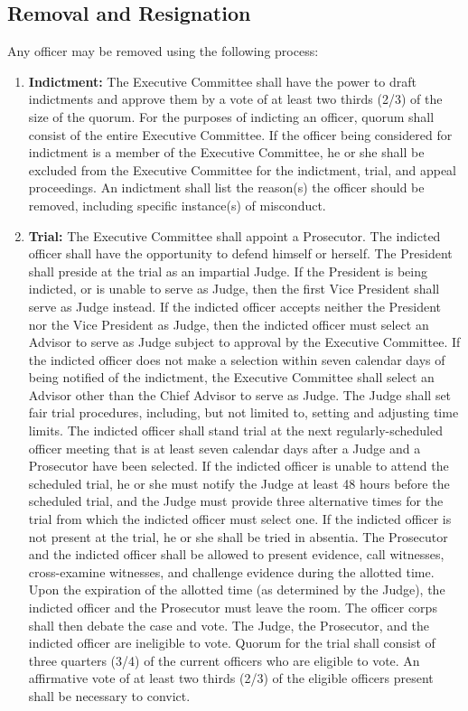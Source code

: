 \documentclass{article}
\begin{document}
	\subsection{Removal and Resignation}
	Any officer may be removed using the following process:
	\begin{enumerate}[\indent (a)]
		\item \textbf{Indictment:} The Executive Committee shall have the power to draft indictments and approve them by a vote of at least two thirds (2/3) of the size of the quorum. For the purposes of indicting an officer, quorum shall consist of the entire Executive Committee. If the officer being considered for indictment is a member of the Executive Committee, he or she shall be excluded from the Executive Committee for the indictment, trial, and appeal proceedings. An indictment shall list the reason(s) the officer should be removed, including specific instance(s) of misconduct.
		\item \textbf{Trial:} The Executive Committee shall appoint a Prosecutor. The indicted officer shall have the opportunity to defend himself or herself. The President shall preside at the trial as an impartial Judge. If the President is being indicted, or is unable to serve as Judge, then the first Vice President shall serve as Judge instead. If the indicted officer accepts neither the President nor the Vice President as Judge, then the indicted officer must select an Advisor to serve as Judge subject to approval by the Executive Committee. If the indicted officer does not make a selection within seven calendar days of being notified of the indictment, the Executive Committee shall select an Advisor other than the Chief Advisor to serve as Judge. The Judge shall set fair trial procedures, including, but not limited to, setting and adjusting time limits. The indicted officer shall stand trial at the next regularly-scheduled officer meeting that is at least seven calendar days after a Judge and a Prosecutor have been selected. If the indicted officer is unable to attend the scheduled trial, he or she must notify the Judge at least 48 hours before the scheduled trial, and the Judge must provide three alternative times for the trial from which the indicted officer must select one. If the indicted officer is not present at the trial, he or she shall be tried in absentia. The Prosecutor and the indicted officer shall be allowed to present evidence, call witnesses, cross-examine witnesses, and challenge evidence during the allotted time. Upon the expiration of the allotted time (as determined by the Judge), the indicted officer and the Prosecutor must leave the room. The officer corps shall then debate the case and vote. The Judge, the Prosecutor, and the indicted officer are ineligible to vote. Quorum for the trial shall consist of three quarters (3/4) of the current officers who are eligible to vote. An affirmative vote of at least two thirds (2/3) of the eligible officers present shall be necessary to convict. 

\end{enumerate}
\end{document}
